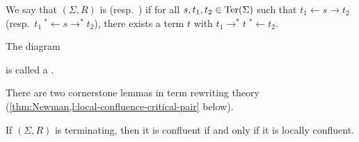 We say that $(\Sigma,R)$ is  (resp.\ ) if for all $s,t_1,t_2 \in \mathrm{Ter}(\Sigma)$ such that $t_1 \leftarrow s \to t_2$ (resp.\ $t_1 \:{}^*\!\!\leftarrow s \to^* t_2$), there exists a term $t$ with $t_1 \to^* t\; {}^*\!\!\leftarrow t_2$.  
\begin{samepage}
The diagram  
\begin{center}
\end{center}
is called a .
\end{samepage}

There are two cornerstone lemmas in term rewriting theory (\cref{thm:Newman,l:local-confluence-critical-pair} below).

\begin{lemma}
  \label{thm:Newman}
  If $(\Sigma,R)$ is terminating, then it is confluent if and only if it is locally confluent.
\end{lemma}

